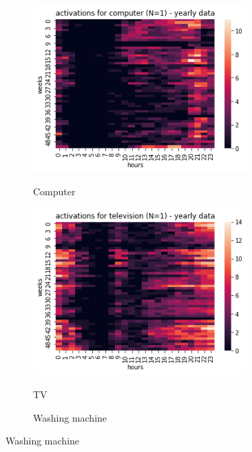 \begin{figure}[H]
	\begin{subfigure}{.32\textwidth}
		\centering
		\caption{Computer}
		\includegraphics[width=0.9\textwidth]{../Figures/LPS/HM_Ywh_comp.png}
		\label{fig:HM_Ywh_comp}
	\end{subfigure}%
	\begin{subfigure}{.32\textwidth}
		\centering
		\caption{TV}
		\includegraphics[width=0.9\textwidth]{../Figures/LPS/HM_Ywh_tv.png}
		\label{fig:HM_Ywh_tv}
	\end{subfigure}%
	\begin{subfigure}{.32\textwidth}
		\centering
		\caption{Washing machine}

\end{subfigure}
\end{figure}
